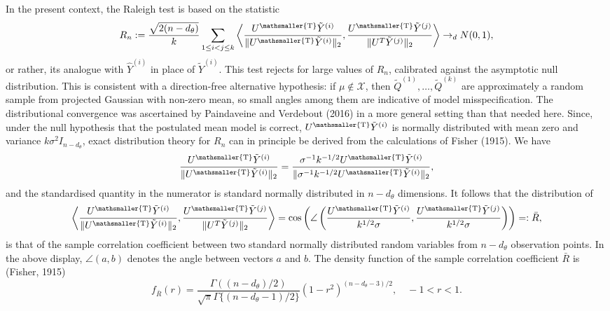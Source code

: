 \documentclass[10pt, reqno]{amsart}
\numberwithin{equation}{section}
\newcommand{\T}{{\mathsmaller {\rm T}}}
\begin{document}
In the present context, the Raleigh test is based on the statistic
%
\begin{equation}\label{eqRn}
	R_n := \frac{\sqrt{2(n - d_{\theta})}}{k} \sum_{1 \leq i < j \leq k} \left< \frac{U^\T \tilde Y^{(i)}}{\lVert U^\T \tilde Y^{(i)} \rVert_2} , \frac{U^\T \tilde Y^{(j)}}{\lVert U^T \tilde Y^{(j)} \rVert_2} \right> \rightarrow_{d} N(0, 1),
\end{equation}
%
or rather, its analogue with $\hat{Y}^{(i)}$ in place of $\tilde{Y}^{(i)}$. This test rejects for large values of $R_n$, calibrated against the asymptotic null distribution. This is consistent with a direction-free alternative hypothesis: if $\mu\notin \mathcal{X}$, then $\tilde Q^{(1)},\ldots, \tilde Q^{(k)}$ are approximately a random sample from projected Gaussian with non-zero mean, so small angles among them are indicative of model misspecification. The distributional convergence was ascertained by Paindaveine and Verdebout (2016) in a more general setting than that needed here. Since, under the null hypothesis that the postulated mean model is correct, $U^\T \tilde{Y}^{(i)}$ is normally distributed with mean zero and variance $k\sigma^2 I_{n-d_\theta}$, exact distribution theory for $R_n$ can in principle be derived from the calculations of Fisher (1915). We have
%
\begin{equation}\label{eqStandardised}
	\frac{U^\T \tilde Y^{(i)}}{\lVert U^\T \tilde Y^{(i)} \rVert_2} = \frac{\sigma^{-1} k^{-1/2} U^\T \tilde Y^{(i)}}{\lVert \sigma^{-1}k^{-1/2} U^\T \tilde Y^{(i)} \rVert_2},
\end{equation}
%
and the standardised quantity in the numerator is standard normally distributed in $n-d_\theta$ dimensions. It follows that the distribution of 
\[
\left< \frac{U^\T \tilde Y^{(i)}}{\lVert U^\T \tilde Y^{(i)} \rVert_2} , \frac{U^\T \tilde Y^{(j)}}{\lVert U^T \tilde Y^{(j)} \rVert_2} \right> = \cos\left(\angle \left(\frac{U^\T \tilde Y^{(i)}}{k^{1/2}\sigma}, \frac{U^\T \tilde Y^{(j)}}{k^{1/2}\sigma}\right) \right) =: \bar{R},
\]
is that of the sample correlation coefficient between two standard normally distributed random variables from $n-d_\theta$ observation points. In the above display, $\angle(a,b)$ denotes the angle between vectors $a$ and $b$. The density function of the sample correlation coefficient $\bar{R}$ is (Fisher, 1915)
%
\begin{equation}\label{eqFisher1915}
	f_{\bar{R}}(r) =\frac{\Gamma((n-d_\theta)/2)}{\sqrt{\pi}\Gamma\{(n-d_\theta-1)/2\}} (1-r^{2})^{(n-d_\theta-3)/2}, \quad -1<r<1.
\end{equation}
\end{document}

